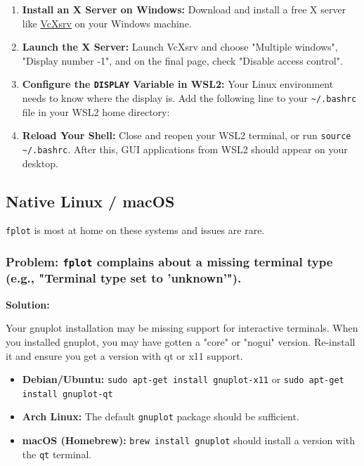 \documentclass[12pt, letterpaper]{article}
\begin{document}
	\begin{enumerate}
		\item \textbf{Install an X Server on Windows:} Download and install a free X server like \href{https://sourceforge.net/projects/vcxsrv/}{VcXsrv} on your Windows machine.
		\item \textbf{Launch the X Server:} Launch VcXsrv and choose "Multiple windows", "Display number -1", and on the final page, check "Disable access control".
		\item \textbf{Configure the \texttt{DISPLAY} Variable in WSL2:} Your Linux environment needs to know where the display is. Add the following line to your \texttt{\textasciitilde/.bashrc} file in your WSL2 home directory:
		\item \textbf{Reload Your Shell:} Close and reopen your WSL2 terminal, or run \texttt{source \textasciitilde/.bashrc}. After this, GUI applications from WSL2 should appear on your desktop.
	\end{enumerate}
	
	\subsection{Native Linux / macOS}
	
	\texttt{fplot} is most at home on these systems and issues are rare.
	
	\subsubsection*{Problem: \texttt{fplot} complains about a missing terminal type (e.g., "Terminal type set to 'unknown'").}
	
	\textbf{Solution:}
	
	Your gnuplot installation may be missing support for interactive terminals. When you installed gnuplot, you may have gotten a "core" or "nogui" version. Re-install it and ensure you get a version with qt or x11 support.
	
	\begin{itemize}
		\item \textbf{Debian/Ubuntu:} \texttt{sudo apt-get install gnuplot-x11} or \texttt{sudo apt-get install gnuplot-qt}
		\item \textbf{Arch Linux:} The default \texttt{gnuplot} package should be sufficient.
		\item \textbf{macOS (Homebrew):} \texttt{brew install gnuplot} should install a version with the \texttt{qt} terminal.
	\end{itemize}
	
\end{document}
